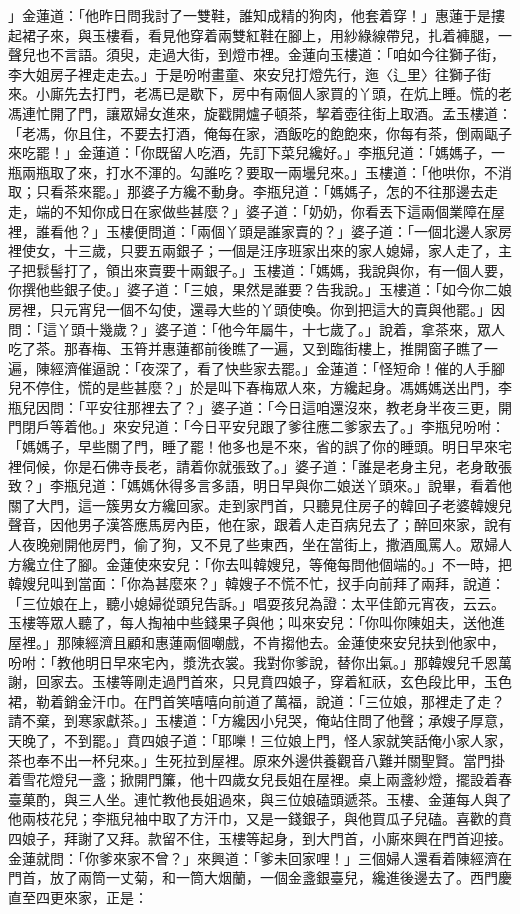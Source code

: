 \begin{showcontents}{}
」金蓮道：「他昨日問我討了一雙鞋，誰知成精的狗肉，他套着穿！」惠蓮于是摟起裙子來，與玉樓看，看見他穿着兩雙紅鞋在腳上，用紗綠線帶兒，扎着褲腿，一聲兒也不言語。須臾，走過大街，到燈市裡。金蓮向玉樓道：「咱如今往獅子街，李大姐房子裡走走去。」于是吩咐畫童、來安兒打燈先行，迤〈辶里〉往獅子街來。小廝先去打門，老馮已是歇下，房中有兩個人家買的丫頭，在炕上睡。慌的老馮連忙開了門，讓眾婦女進來，旋戳開爐子頓茶，挈着壺往街上取酒。孟玉樓道：「老馮，你且住，不要去打酒，俺每在家，酒飯吃的飽飽來，你每有茶，倒兩甌子來吃罷！」金蓮道：「你既留人吃酒，先訂下菜兒纔好。」李瓶兒道：「媽媽子，一瓶兩瓶取了來，打水不渾的。勾誰吃？要取一兩壜兒來。」玉樓道：「他哄你，不消取；只看茶來罷。」那婆子方纔不動身。李瓶兒道：「媽媽子，怎的不往那邊去走走，端的不知你成日在家做些甚麼？」婆子道：「奶奶，你看丟下這兩個業障在屋裡，誰看他？」玉樓便問道：「兩個丫頭是誰家賣的？」婆子道：「一個北邊人家房裡使女，十三歲，只要五兩銀子；一個是汪序班家出來的家人媳婦，家人走了，主子把䯼髻打了，領出來賣要十兩銀子。」玉樓道：「媽媽，我說與你，有一個人要，你撰他些銀子使。」婆子道：「三娘，果然是誰要？告我說。」玉樓道：「如今你二娘房裡，只元宵兒一個不勾使，還尋大些的丫頭使喚。你到把這大的賣與他罷。」因問：「這丫頭十幾歲？」婆子道：「他今年屬牛，十七歲了。」說着，拿茶來，眾人吃了茶。那春梅、玉筲并惠蓮都前後瞧了一遍，又到臨街樓上，推開窗子瞧了一遍，陳經濟催逼說：「夜深了，看了快些家去罷。」金蓮道：「怪短命！催的人手腳兒不停住，慌的是些甚麼？」於是叫下春梅眾人來，方纔起身。馮媽媽送出門，李瓶兒因問：「平安往那裡去了？」婆子道：「今日這咱還沒來，教老身半夜三更，開門閉戶等着他。」來安兒道：「今日平安兒跟了爹往應二爹家去了。」李瓶兒吩咐：「媽媽子，早些關了門，睡了罷！他多也是不來，省的誤了你的睡頭。明日早來宅裡伺候，你是石佛寺長老，請着你就張致了。」婆子道：「誰是老身主兒，老身敢張致？」李瓶兒道：「媽媽休得多言多語，明日早與你二娘送丫頭來。」說畢，看着他關了大門，這一簇男女方纔回家。走到家門首，只聽見住房子的韓回子老婆韓嫂兒聲音，因他男子漢答應馬房內臣，他在家，跟着人走百病兒去了；醉回來家，說有人夜晚剜開他房門，偷了狗，又不見了些東西，坐在當街上，撒酒風罵人。眾婦人方纔立住了腳。金蓮使來安兒：「你去叫韓嫂兒，等俺每問他個端的。」不一時，把韓嫂兒叫到當面：「你為甚麼來？」韓嫂子不慌不忙，扠手向前拜了兩拜，說道：「三位娘在上，聽小媳婦從頭兒告訴。」唱耍孩兒為證：太平佳節元宵夜，云云。玉樓等眾人聽了，每人掏袖中些錢果子與他；叫來安兒：「你叫你陳姐夫，送他進屋裡。」那陳經濟且顧和惠蓮兩個嘲戲，不肯搊他去。金蓮使來安兒扶到他家中，吩咐：「教他明日早來宅內，漿洗衣裳。我對你爹說，替你出氣。」那韓嫂兒千恩萬謝，回家去。玉樓等剛走過門首來，只見賁四娘子，穿着紅祆，玄色段比甲，玉色裙，勒着銷金汗巾。在門首笑嘻嘻向前道了萬福，說道：「三位娘，那裡走了走？請不棄，到寒家獻茶。」玉樓道：「方纔因小兒哭，俺站住問了他聲；承嫂子厚意，天晚了，不到罷。」賁四娘子道：「耶嚛！三位娘上門，怪人家就笑話俺小家人家，茶也奉不出一杯兒來。」生死拉到屋裡。原來外邊供養觀音八難并關聖賢。當門掛着雪花燈兒一盞；掀開門簾，他十四歲女兒長姐在屋裡。桌上兩盞紗燈，擺設着春臺菓酌，與三人坐。連忙教他長姐過來，與三位娘磕頭遞茶。玉樓、金蓮每人與了他兩枝花兒；李瓶兒袖中取了方汗巾，又是一錢銀子，與他買瓜子兒磕。喜歡的賁四娘子，拜謝了又拜。款留不住，玉樓等起身，到大門首，小廝來興在門首迎接。金蓮就問：「你爹來家不曾？」來興道：「爹未回家哩！」三個婦人還看着陳經濟在門首，放了兩筒一丈菊，和一筒大烟蘭，一個金盞銀臺兒，纔進後邊去了。西門慶直至四更來家，正是：


\end{showcontents}
